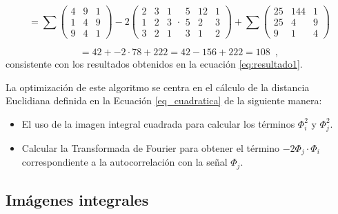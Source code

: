 \begin{equation}
=\sum\left(\begin{array}{ccc}
4 & 9 & 1\\
1 & 4 & 9\\
9 & 4 & 1
\end{array}\right)-2\left(\begin{array}{ccc}
2 & 3 & 1\\
1 & 2 & 3\\
3 & 2 & 1
\end{array}\cdot\begin{array}{ccc}
5 & 12 & 1\\
5 & 2 & 3\\
3 & 1 & 2
\end{array}\right)
+\sum\left(\begin{array}{ccc}
25 & 144 & 1\\
25 & 4 & 9\\
9 & 1 & 4
\end{array}\right)
\end{equation}



\begin{equation}
=42+-2\cdot78+222=42-156+222=108\label{eq:cuadrados-1} \enspace ,
\end{equation}
consistente con los resultados obtenidos en la ecuaci\'on \ref{eq:resultado1}.




La optimizaci\'on de este algoritmo se centra en el c\'alculo de la distancia Euclidiana definida en la Ecuaci\'on \ref{eq_cuadratica} de la siguiente manera:
\begin{itemize}
\item El uso de la imagen integral cuadrada para calcular los t\'erminos $\varPhi_{i}^{2}$
y $\varPhi_{j}^{2}$.
\item Calcular la Transformada de Fourier para obtener el t\'ermino $-2\varPhi_{j}\cdot\varPhi_{i}$
correspondiente a la autocorrelaci\'on con la se\~nal
$\varPhi_{j}$.
\end{itemize}
 
\subsection{Im\'agenes integrales}


